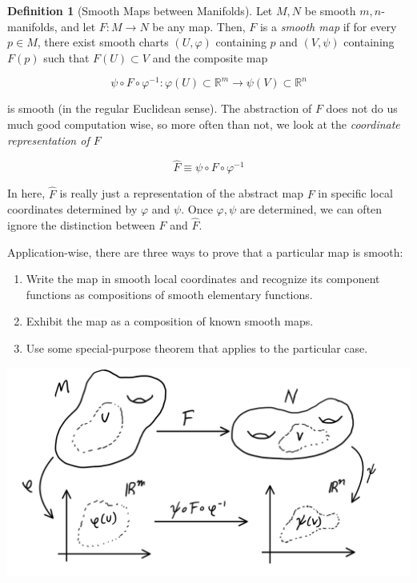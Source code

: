 \documentclass{article}
\theoremstyle{remark}
\theoremstyle{definition}
\newtheorem{definition}{Definition}[section]
\begin{document}
  \begin{definition}[Smooth Maps between Manifolds]
    Let $M, N$ be smooth $m, n$-manifolds, and let $F: M \longrightarrow N$ be any map. Then, $F$ is a \textit{smooth map} if for every $p \in M$, there exist smooth charts $(U, \varphi)$ containing $p$ and $(V, \psi)$ containing $F(p)$ such that $F(U) \subset V$ and the composite map 

      \[\psi \circ F \circ \varphi^{-1}: \varphi(U) \subset \mathbb{R}^m \longrightarrow \psi(V) \subset \mathbb{R}^n\]

    is smooth (in the regular Euclidean sense). The abstraction of $F$ does not do us much good computation wise, so more often than not, we look at the \textit{coordinate representation of $F$}

      \[\hat{F} \equiv \psi \circ F \circ \varphi^{-1}\]

    In here, $\hat{F}$ is really just a representation of the abstract map $F$ in specific local coordinates determined by $\varphi$ and $\psi$. Once $\varphi, \psi$ are determined, we can often ignore the distinction between $F$ and $\hat{F}$. 

    Application-wise, there are three ways to prove that a particular map is smooth: 
    \begin{enumerate}
      \item Write the map in smooth local coordinates and recognize its component functions as compositions of smooth elementary functions. 
      \item Exhibit the map as a composition of known smooth maps. 
      \item Use some special-purpose theorem that applies to the particular case. 
    \end{enumerate}

    \begin{center}
      \includegraphics[scale=0.25]{img/Functions_between_Manifolds.PNG}
    \end{center}
  \end{definition}
\end{document}
